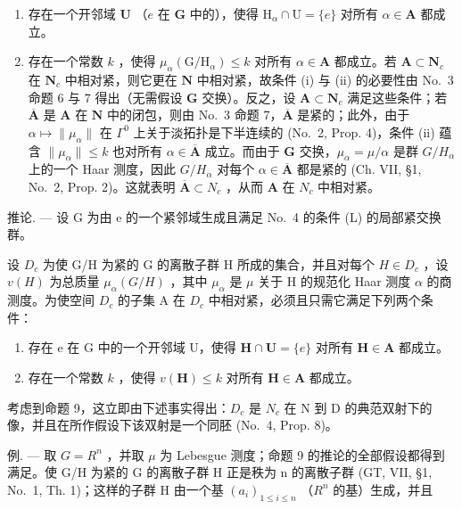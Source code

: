 \begin{enumerate}
\def\labelenumi{(\roman{enumi})}
\item
  存在一个开邻域 \(\mathbf{U}\) （\(e\) 在 \(\mathbf{G}\) 中的），使得 \(\mathrm{H}_{\alpha} \cap \mathrm{U} = \{e\}\) 对所有 \(\alpha \in \mathbf{A}\) 都成立。
\item
  存在一个常数 \(k\) ，使得 \(\mu_{\alpha}(\mathrm{G} / \mathrm{H}_{\alpha}) \leqslant k\) 对所有 \(\alpha \in \mathbf{A}\) 都成立。若 \(\mathbf{A} \subset \mathbf{N}_c\) 在 \(\mathbf{N}_c\) 中相对紧，则它更在 \(\mathbf{N}\) 中相对紧，故条件 (i) 与 (ii) 的必要性由 No.~3 命题 6 与 7 得出（无需假设 \(\mathbf{G}\) 交换）。反之，设 \(\mathbf{A} \subset \mathbf{N}_c\) 满足这些条件；若 \(\overline{\mathbf{A}}\) 是 \(\mathbf{A}\) 在 \(\mathbf{N}\) 中的闭包，则由 No.~3 命题 7，\(\overline{\mathbf{A}}\) 是紧的；此外，由于 \(\alpha \mapsto \| \mu_{\alpha} \|\) 在 \(\Gamma^0\) 上关于淡拓扑是下半连续的 (No.~2, Prop. 4)，条件 (ii) 蕴含 \(\| \mu_{\alpha} \| \leqslant k\) 也对所有 \(\alpha \in \overline{\mathbf{A}}\) 成立。而由于 \(\mathbf{G}\) 交换，\(\mu_{\alpha} = \mu / \alpha\) 是群 \(G / H_{\alpha}\) 上的一个 Haar 测度，因此 \(G / H_{\alpha}\) 对每个 \(\alpha \in \overline{\mathbf{A}}\) 都是紧的 (Ch. VII, §1, No.~2, Prop. 2)。这就表明 \(\overline{\mathbf{A}} \subset N_c\) ，从而 \(\mathbf{A}\) 在 \(N_c\) 中相对紧。
\end{enumerate}

推论. --- 设 G 为由 e 的一个紧邻域生成且满足 No.~4 的条件 (L) 的局部紧交换群。

设 \(D_c\) 为使 G/H 为紧的 G 的离散子群 H 所成的集合，并且对每个 \(H \in D_c\) ，设 \(v(H)\) 为总质量 \(\mu_\alpha(G/H)\) ，其中 \(\mu_\alpha\) 是 \(\mu\) 关于 H 的规范化 Haar 测度 \(\alpha\) 的商测度。为使空间 \(D_c\) 的子集 A 在 \(D_c\) 中相对紧，必须且只需它满足下列两个条件：

\begin{enumerate}
\def\labelenumi{(\roman{enumi})}
\item
  存在 e 在 G 中的一个开邻域 U，使得 \(\mathbf{H} \cap \mathbf{U} = \{e\}\) 对所有 \(\mathbf{H} \in \mathbf{A}\) 都成立。
\item
  存在一个常数 \(k\) ，使得 \(v(\mathbf{H}) \leqslant k\) 对所有 \(\mathbf{H} \in \mathbf{A}\) 都成立。
\end{enumerate}

考虑到命题 9，这立即由下述事实得出：\(D_{c}\) 是 \(N_{c}\) 在 N 到 D 的典范双射下的像，并且在所作假设下该双射是一个同胚 (No.~4, Prop. 8)。

例. --- 取 \(G = R^{n}\) ，并取 \(\mu\) 为 Lebesgue 测度；命题 9 的推论的全部假设都得到满足。使 G/H 为紧的 G 的离散子群 H 正是秩为 n 的离散子群 (GT, VII, §1, No.~1, Th. 1)；这样的子群 H 由一个基 \((a_{i})_{1 \leqslant i \leqslant n}\) （\(R^{n}\) 的基）生成，并且

